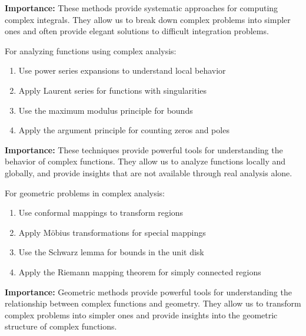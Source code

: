 \noindent\textbf{Importance:} These methods provide systematic approaches for computing complex integrals. They allow us to break down complex problems into simpler ones and often provide elegant solutions to difficult integration problems.



\begin{theorem}
For analyzing functions using complex analysis:
\begin{enumerate}[label=(\alph*)]
\item Use power series expansions to understand local behavior
\item Apply Laurent series for functions with singularities
\item Use the maximum modulus principle for bounds
\item Apply the argument principle for counting zeros and poles
\end{enumerate}
\end{theorem}

\noindent\textbf{Importance:} These techniques provide powerful tools for understanding the behavior of complex functions. They allow us to analyze functions locally and globally, and provide insights that are not available through real analysis alone.



\begin{theorem}
For geometric problems in complex analysis:
\begin{enumerate}[label=(\alph*)]
\item Use conformal mappings to transform regions
\item Apply Möbius transformations for special mappings
\item Use the Schwarz lemma for bounds in the unit disk
\item Apply the Riemann mapping theorem for simply connected regions
\end{enumerate}
\end{theorem}

\noindent\textbf{Importance:} Geometric methods provide powerful tools for understanding the relationship between complex functions and geometry. They allow us to transform complex problems into simpler ones and provide insights into the geometric structure of complex functions.



